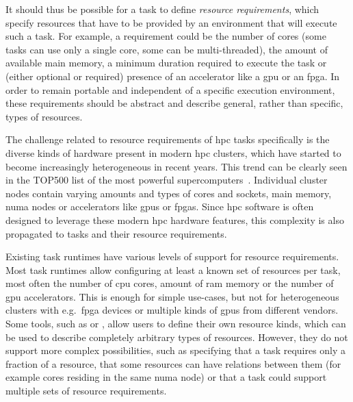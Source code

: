 It should thus be possible for a task to define \emph{resource requirements}, which specify
resources that have to be provided by an environment that will execute such a task. For example, a
requirement could be the number of cores (some tasks can use only a single core, some can be
multi-threaded), the amount of available main memory, a minimum duration required to execute the
task or (either optional or required) presence of an accelerator like a \gls{gpu}
or an \gls{fpga}. In order to remain portable and independent of a specific
execution environment, these requirements should be abstract and describe general, rather than
specific, types of resources.

The challenge related to resource requirements of \gls{hpc} tasks specifically is
the diverse kinds of hardware present in modern \gls{hpc} clusters, which have
started to become increasingly heterogeneous in recent years. This trend can be clearly seen in the
TOP500 list of the most powerful supercomputers~\cite{top500analysis}. Individual cluster
nodes contain varying amounts and types of cores and sockets, main memory,
\gls{numa} nodes or accelerators like \glspl{gpu} or
\glspl{fpga}. Since \gls{hpc} software is often designed to
leverage these modern \gls{hpc} hardware features, this complexity is also
propagated to tasks and their resource requirements.

Existing task runtimes have various levels of support for resource requirements. Most task
runtimes allow configuring at least a known set of resources per task, most often the number of
\gls{cpu} cores, amount of \gls{ram} memory or the number of \gls{gpu} accelerators. This is
enough for simple use-cases, but not for heterogeneous clusters with e.g.\ \gls{fpga} devices or
multiple kinds of \glspl{gpu} from different vendors. Some tools, such as \dask{} or \snakemake{},
allow users to define their own resource kinds, which can be used to describe completely
arbitrary types of resources. However, they do not support more complex possibilities, such as
specifying that a task requires only a fraction of a resource, that some resources can have
relations between them (for example cores residing in the same \gls{numa} node) or that a task
could support multiple sets of resource requirements.


